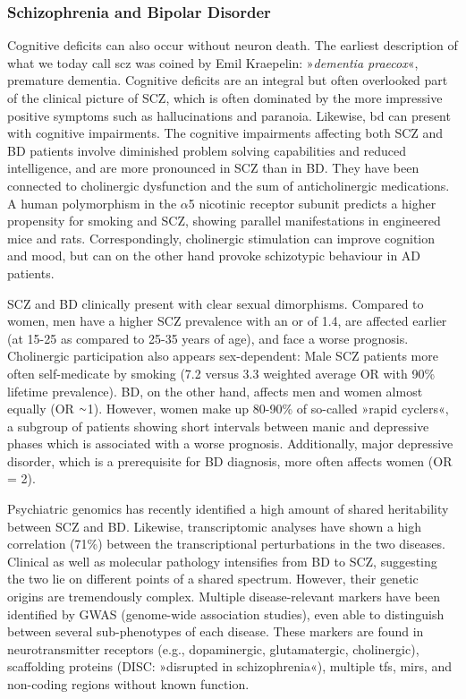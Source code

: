 \subsubsection{Schizophrenia and Bipolar Disorder} 
Cognitive deficits can also occur without neuron death. The earliest description of what we today call \ac{scz} was coined by Emil Kraepelin: »\emph{dementia praecox}«, premature dementia\cite{Kraepelin1913}. Cognitive deficits are an integral but often overlooked part of the clinical picture of SCZ, which is often dominated by the more impressive positive symptoms such as hallucinations and paranoia. Likewise, \ac{bd} can present with cognitive impairments. The cognitive impairments affecting both SCZ and BD patients involve diminished problem solving capabilities and reduced intelligence, and are more pronounced in SCZ than in BD\cite{Bortolato2015}. They have been connected to cholinergic dysfunction\cite{VanEnkhuizen2015, Smucny2017} and the sum of anticholinergic medications\cite{Gray2015, Eum2017}. A human polymorphism in the $\alpha$5 nicotinic receptor subunit predicts a higher propensity for smoking and SCZ, showing parallel manifestations in engineered mice\cite{Koukouli2017} and rats\cite{Forget2018}. Correspondingly, cholinergic stimulation can improve cognition\cite{Sacco2004, Rowe2015, Lewis2017} and mood\cite{Higley2014}, but can on the other hand provoke schizotypic behaviour in AD patients\cite{Degirmenci2016}.

SCZ and BD clinically present with clear sexual dimorphisms. Compared to women, men have a higher SCZ prevalence with an \ac{or} of 1.4, are affected earlier (at 15-25 as compared to 25-35 years of age), and face a worse prognosis\cite{Leger2016}. Cholinergic participation also appears sex-dependent: Male SCZ patients more often self-medicate by smoking (7.2 versus 3.3 weighted average OR with 90\% lifetime prevalence)\cite{DeLeon2005}. BD, on the other hand, affects men and women almost equally (OR $\smallsim$\num{1}). However, women make up 80-90\% of so-called »rapid cyclers«, a subgroup of patients showing short intervals between manic and depressive phases which is associated with a worse prognosis\cite{Berger2014}. Additionally, major depressive disorder, which is a prerequisite for BD diagnosis, more often affects women\cite{Berger2014} (OR = 2).

Psychiatric genomics has recently identified a high amount of shared heritability between SCZ and BD\cite{Anttila2018}. Likewise, transcriptomic analyses have shown a high correlation (71\%) between the transcriptional perturbations in the two diseases\cite{Gandal2018}. Clinical as well as molecular pathology intensifies from BD to SCZ, suggesting the two lie on different points of a shared spectrum. However, their genetic origins are tremendously complex. Multiple disease-relevant markers have been identified by GWAS (genome-wide association studies), even able to distinguish between several sub-phenotypes of each disease\cite{Ruderfer2018}. These markers are found in neurotransmitter receptors (e.g., dopaminergic, glutamatergic, cholinergic), scaffolding proteins (DISC: »disrupted in schizophrenia«), multiple \acp{tf}, \acp{mir}, and non-coding regions without known function\cite{Harrison2015, Henriksen2017, Kanazawa2017}.

